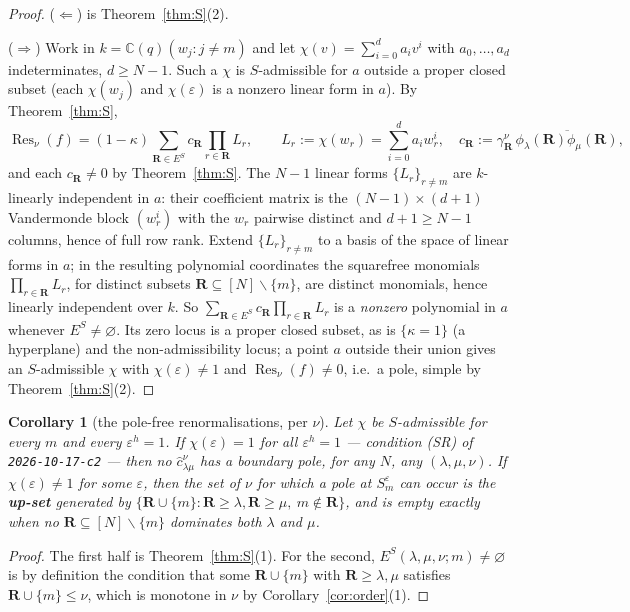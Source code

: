 \documentclass[11pt]{article}
\newtheorem{cor}[thm]{Corollary}
\theoremstyle{definition}
\newcommand{\bR}{\mathbf{R}}
\newcommand{\sm}{\smallsetminus}
\newcommand{\ES}{E^{S}}
\begin{document}
\begin{proof}
($\Leftarrow$) is Theorem~\ref{thm:S}(2).

($\Rightarrow$)  Work in $k=\mathbb{C}(q)(w_j:j\ne m)$ and let
$\chi(v)=\sum_{i=0}^{d}a_iv^{i}$ with $a_0,\dots,a_d$ indeterminates, $d\ge N-1$.
Such a $\chi$ is $S$-admissible for $a$ outside a proper closed subset (each
$\chi(w_j)$ and $\chi(\varepsilon)$ is a nonzero linear form in $a$).  By
Theorem~\ref{thm:S},
\[
  \operatorname{Res}_\nu(f)
  =(1-\kappa)\sum_{\bR\in\ES}c_{\bR}\prod_{r\in\bR}L_r,
  \qquad
  L_r:=\chi(w_r)=\sum_{i=0}^{d}a_iw_r^{i},
  \quad
  c_{\bR}:=\gamma^{\nu}_{\bR}\,\overline{\phi_\lambda(\bR)\phi_\mu(\bR)} ,
\]
and each $c_{\bR}\ne0$ by Theorem~\ref{thm:S}.  The $N-1$ linear forms
$\{L_r\}_{r\ne m}$ are $k$-linearly independent in $a$: their coefficient matrix
is the $(N-1)\times(d+1)$ Vandermonde block $(w_r^{i})$ with the $w_r$ pairwise
distinct and $d+1\ge N-1$ columns, hence of full row rank.  Extend
$\{L_r\}_{r\ne m}$ to a basis of the space of linear forms in $a$; in the
resulting polynomial coordinates the squarefree monomials
$\prod_{r\in\bR}L_r$, for distinct subsets $\bR\subseteq[N]\sm\{m\}$, are
distinct monomials, hence linearly independent over $k$.  So
$\sum_{\bR\in\ES}c_{\bR}\prod_{r\in\bR}L_r$ is a \emph{nonzero} polynomial in
$a$ whenever $\ES\ne\varnothing$.  Its zero locus is a proper closed subset, as
is $\{\kappa=1\}$ (a hyperplane) and the non-admissibility locus; a point $a$
outside their union gives an $S$-admissible $\chi$ with $\chi(\varepsilon)\ne1$
and $\operatorname{Res}_\nu(f)\ne0$, i.e.\ a pole, simple by
Theorem~\ref{thm:S}(2).
\end{proof}

\begin{cor}[the pole-free renormalisations, per $\nu$]\label{cor:free}
Let $\chi$ be $S$-admissible for every $m$ and every $\varepsilon^{h}=1$.  If
$\chi(\varepsilon)=1$ for all $\varepsilon^{h}=1$ --- condition \textup{(SR)} of
\texttt{2026-10-17-c2} --- then no $\hat c^{\nu}_{\lambda\mu}$ has a boundary pole,
for any $N$, any $(\lambda,\mu,\nu)$.  If $\chi(\varepsilon)\ne1$ for some
$\varepsilon$, then the set of $\nu$ for which a pole at $S_m^{\varepsilon}$ can
occur is the \textbf{up-set} generated by
$\{\bR\cup\{m\}:\bR\ge\lambda,\bR\ge\mu,\ m\notin\bR\}$, and is empty exactly
when no $\bR\subseteq[N]\sm\{m\}$ dominates both $\lambda$ and $\mu$.
\end{cor}

\begin{proof}
The first half is Theorem~\ref{thm:S}(1).  For the second,
$\ES(\lambda,\mu,\nu;m)\ne\varnothing$ is by definition the condition that some
$\bR\cup\{m\}$ with $\bR\ge\lambda,\mu$ satisfies $\bR\cup\{m\}\le\nu$, which is
monotone in $\nu$ by Corollary~\ref{cor:order}(1).
\end{proof}
\end{document}
